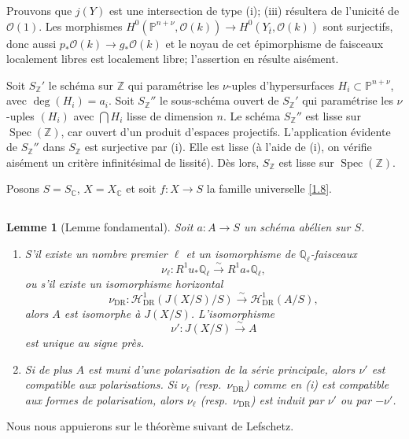 \documentclass[10pt,leqno]{amsart}
\theoremstyle{plain}
\newtheorem{lemma}[theorem]{Lemme}
\theoremstyle{definition}
\theoremstyle{remark}
\DeclareMathOperator{\Spec}{Spec}
\newcommand{\ZZ}{\mathbb{Z}}
\newcommand{\QQ}{\mathbb{Q}}
\newcommand{\CC}{\mathbb{C}}
\newcommand{\PP}{\mathbb{P}}
\newcommand{\Oo}{\mathscr{O}}
\begin{document}
Prouvons que $j(Y)$ est une intersection de type (i); (iii) r\'esultera de l'unicit\'e de $\Oo(1)$. Les morphismes $H^0(\PP^{n+\nu},\Oo(k))\to H^0(Y_{\bar{t}},\Oo(k))$ sont surjectifs, donc aussi $p_*\Oo(k)\to g_*\Oo(k)$ et le noyau de cet \'epimorphisme de faisceaux localement libres est localement libre; l'assertion en r\'esulte ais\'ement.

Soit $S_\ZZ'$ le sch\'ema sur $\ZZ$ qui param\'etrise les $\nu$-uples d'hypersurfaces $H_i\subset\PP^{n+\nu}$, avec $\deg(H_i)=a_i$. Soit $S_\ZZ''$ le sous-sch\'ema ouvert de $S_\ZZ'$ qui param\'etrise les $\nu$-uples $(H_i)$ avec $\bigcap H_i$ lisse de dimension $n$. Le sch\'ema $S_\ZZ''$ est lisse sur $\Spec(\ZZ)$, car ouvert d'un produit d'espaces projectifs. L'application \'evidente de $S_\ZZ''$ dans $S_\ZZ$ est surjective par (i). Elle est lisse (\`a l'aide de (i), on v\'erifie ais\'ement un crit\`ere infinit\'esimal de lissit\'e). D\`es lors, $S_\ZZ$ est lisse sur $\Spec(\ZZ)$.

Posons $S=S_\CC$, $X=X_\CC$ et soit $f\colon X\to S$ la famille universelle \ref{1.8}.

\subsection{}

\begin{lemma}[Lemme fondamental]\label{lem:1.10}
Soit $a\colon A\to S$ un sch\'ema ab\'elien sur $S$.
\begin{enumerate}
\item[(i)] S'il existe un nombre premier $\ell$ et un isomorphisme de $\QQ_\ell$-faisceaux
\[
\nu_\ell\colon R^1u_*\QQ_\ell\xrightarrow{\sim}R^1a_*\QQ_\ell,
\]
ou s'il existe un isomorphisme horizontal
\[
\nu_{\mathrm{DR}}\colon\mathscr{H}^1_{\mathrm{DR}}(J(X/S)/S)\xrightarrow{\sim}\mathscr{H}^1_{\mathrm{DR}}(A/S),
\]
alors $A$ est isomorphe \`a $J(X/S)$. L'isomorphisme
\[
\nu'\colon J(X/S)\xrightarrow{\sim}A
\]
est unique au signe pr\`es.
\item[(ii)] Si de plus $A$ est muni d'une polarisation de la s\'erie principale, alors $\nu'$ est compatible aux polarisations. Si $\nu_\ell$ \textup(resp.~$\nu_{\mathrm{DR}}$\textup) comme en \textup{(i)} est compatible aux formes de polarisation, alors $\nu_\ell$ \textup(resp.~$\nu_{\mathrm{DR}}$\textup) est induit par $\nu'$ ou par $-\nu'$.
\end{enumerate}
\end{lemma}

Nous nous appuierons sur le th\'eor\`eme suivant de Lefschetz.
\end{document}
